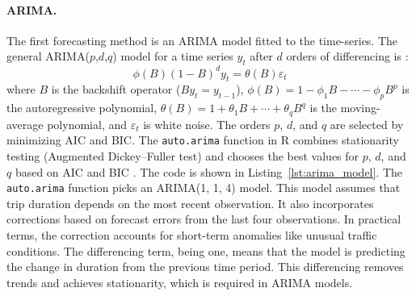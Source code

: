 \documentclass[12pt, a4paper]{article}
\begin{document}
\paragraph{ARIMA.}
The first forecasting method is an ARIMA model fitted to the time-series. The general ARIMA($p$,$d$,$q$) model for a time series $y_t$ after $d$ orders of differencing is \cite{hyndman2006}:
\begin{equation}
  \phi(B)(1-B)^d y_t = \theta(B)\varepsilon_t
  \label{eq:arima}
\end{equation}
where $B$ is the backshift operator ($B y_t = y_{t-1}$), $\phi(B) = 1 - \phi_1 B - \cdots - \phi_p B^p$ is the autoregressive polynomial, $\theta(B) = 1 + \theta_1 B + \cdots + \theta_q B^q$ is the moving-average polynomial, and $\varepsilon_t$ is white noise. The orders $p$, $d$, and $q$ are selected by minimizing AIC and BIC. The \texttt{auto.arima} function in R combines stationarity testing (Augmented Dickey--Fuller test) and chooses the best values for $p$, $d$, and $q$ based on AIC and BIC \cite{forecast_auto_arima}. The code is shown in Listing~\ref{lst:arima_model}. The \texttt{auto.arima} function picks an ARIMA(1, 1, 4) model. This model assumes that trip duration depends on the most recent observation. It also incorporates corrections based on forecast errors from the last four observations. In practical terms, the correction accounts for short-term anomalies like unusual traffic conditions. The differencing term, being one, means that the model is predicting the change in duration from the previous time period. This differencing removes trends and achieves stationarity, which is required in ARIMA models.
\end{document}
